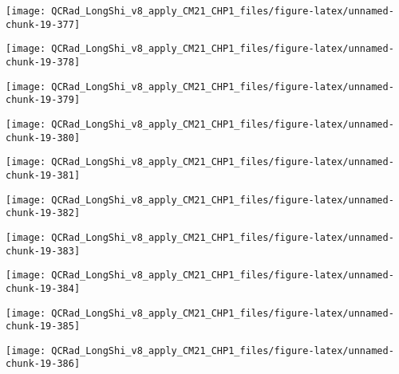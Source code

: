 \documentclass[
  10pt,
  a4paper,oneside]{article}
\begin{document}
\begin{center}\texttt{[image: QCRad\_LongShi\_v8\_apply\_CM21\_CHP1\_files/figure-latex/unnamed-chunk-19-377]} \end{center}

\begin{center}\texttt{[image: QCRad\_LongShi\_v8\_apply\_CM21\_CHP1\_files/figure-latex/unnamed-chunk-19-378]} \end{center}

\begin{center}\texttt{[image: QCRad\_LongShi\_v8\_apply\_CM21\_CHP1\_files/figure-latex/unnamed-chunk-19-379]} \end{center}

\begin{center}\texttt{[image: QCRad\_LongShi\_v8\_apply\_CM21\_CHP1\_files/figure-latex/unnamed-chunk-19-380]} \end{center}

\begin{center}\texttt{[image: QCRad\_LongShi\_v8\_apply\_CM21\_CHP1\_files/figure-latex/unnamed-chunk-19-381]} \end{center}

\begin{center}\texttt{[image: QCRad\_LongShi\_v8\_apply\_CM21\_CHP1\_files/figure-latex/unnamed-chunk-19-382]} \end{center}

\begin{center}\texttt{[image: QCRad\_LongShi\_v8\_apply\_CM21\_CHP1\_files/figure-latex/unnamed-chunk-19-383]} \end{center}

\begin{center}\texttt{[image: QCRad\_LongShi\_v8\_apply\_CM21\_CHP1\_files/figure-latex/unnamed-chunk-19-384]} \end{center}

\begin{center}\texttt{[image: QCRad\_LongShi\_v8\_apply\_CM21\_CHP1\_files/figure-latex/unnamed-chunk-19-385]} \end{center}

\begin{center}\texttt{[image: QCRad\_LongShi\_v8\_apply\_CM21\_CHP1\_files/figure-latex/unnamed-chunk-19-386]} \end{center}
\end{document}
